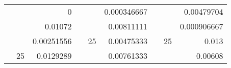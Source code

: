 \begin{table}[H]
\begin{tabular}{|ccrccrccc}
\rowcolor[HTML]{DAE8FC} 
\multicolumn{1}{|c|}{\cellcolor[HTML]{FFFFC7}}                                & \multicolumn{1}{c|}{\cellcolor[HTML]{DAE8FC}}                      & \multicolumn{1}{r|}{\cellcolor[HTML]{DAE8FC}0}           & \multicolumn{1}{c|}{\cellcolor[HTML]{FFFFC7}}                                & \multicolumn{1}{c|}{\cellcolor[HTML]{DAE8FC}}                       & \multicolumn{1}{r|}{\cellcolor[HTML]{DAE8FC}0.000346667} & \multicolumn{1}{c|}{\cellcolor[HTML]{FFFFC7}}                                & \multicolumn{1}{c|}{\cellcolor[HTML]{DAE8FC}}                      & \multicolumn{1}{r|}{\cellcolor[HTML]{DAE8FC}0.00479704}  \\ \cline{3-3} \cline{6-6} \cline{9-9} 
\multicolumn{1}{|c|}{\cellcolor[HTML]{FFFFC7}}                                & \multicolumn{1}{c|}{\cellcolor[HTML]{DAE8FC}}                      & \multicolumn{1}{r|}{\cellcolor[HTML]{DDFDFF}0.01072}     & \multicolumn{1}{c|}{\cellcolor[HTML]{FFFFC7}}                                & \multicolumn{1}{c|}{\cellcolor[HTML]{DAE8FC}}                       & \multicolumn{1}{r|}{\cellcolor[HTML]{DDFDFF}0.00811111}  & \multicolumn{1}{c|}{\cellcolor[HTML]{FFFFC7}}                                & \multicolumn{1}{c|}{\cellcolor[HTML]{DAE8FC}}                      & \multicolumn{1}{r|}{\cellcolor[HTML]{DDFDFF}0.000906667} \\ \cline{3-3} \cline{6-6} \cline{9-9} 
\rowcolor[HTML]{DAE8FC} 
\multicolumn{1}{|c|}{\cellcolor[HTML]{FFFFC7}}                                & \multicolumn{1}{c|}{\cellcolor[HTML]{DAE8FC}}                      & \multicolumn{1}{r|}{\cellcolor[HTML]{DAE8FC}0.00251556}  & \multicolumn{1}{c|}{\cellcolor[HTML]{FFFFC7}}                                & \multicolumn{1}{c|}{\multirow{-9}{*}{\cellcolor[HTML]{DAE8FC}25}}   & \multicolumn{1}{r|}{\cellcolor[HTML]{DAE8FC}0.00475333}  & \multicolumn{1}{c|}{\cellcolor[HTML]{FFFFC7}}                                & \multicolumn{1}{c|}{\multirow{-9}{*}{\cellcolor[HTML]{DAE8FC}25}}  & \multicolumn{1}{r|}{\cellcolor[HTML]{DAE8FC}0.013}       \\ \cline{3-3} \cline{5-6} \cline{8-9} 
\multicolumn{1}{|c|}{\cellcolor[HTML]{FFFFC7}}                                & \multicolumn{1}{c|}{\multirow{-10}{*}{\cellcolor[HTML]{DAE8FC}25}} & \multicolumn{1}{r|}{\cellcolor[HTML]{DDFDFF}0.0129289}   & \multicolumn{1}{c|}{\cellcolor[HTML]{FFFFC7}}                                & \multicolumn{1}{c|}{\cellcolor[HTML]{DDFDFF}}                       & \multicolumn{1}{r|}{\cellcolor[HTML]{DAE8FC}0.00761333}  & \multicolumn{1}{c|}{\cellcolor[HTML]{FFFFC7}}                                & \multicolumn{1}{c|}{\cellcolor[HTML]{DDFDFF}}                      & \multicolumn{1}{r|}{\cellcolor[HTML]{DAE8FC}0.00608}     \\ \cline{2-3} \cline{6-6} \cline{9-9} 

\end{tabular}
\end{table}
